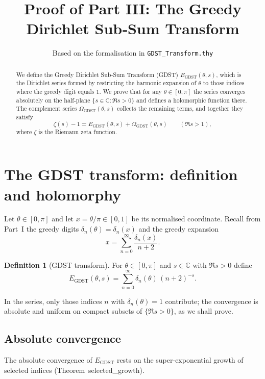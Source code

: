 \documentclass[11pt,a4paper]{article}
\title{Proof of Part III: The Greedy Dirichlet Sub‑Sum Transform}
\author{Based on the formalisation in \texttt{GDST\_Transform.thy}}
\date{}
\theoremstyle{definition}
\newtheorem{definition}[theorem]{Definition}
\theoremstyle{remark}
\newcommand{\C}{\mathbb{C}}
\newcommand{\GDST}{\operatorname{GDST}}
\begin{document}
\maketitle

\begin{abstract}
We define the Greedy Dirichlet Sub‑Sum Transform (GDST) \(E_{\GDST}(\theta,s)\), which is the Dirichlet series formed by restricting the harmonic expansion of \(\theta\) to those indices where the greedy digit equals \(1\).
We prove that for any \(\theta\in[0,\pi]\) the series converges absolutely on the half‑plane \(\{s\in\C:\Re s>0\}\) and defines a holomorphic function there.
The complement series \(\Omega_{\GDST}(\theta,s)\) collects the remaining terms, and together they satisfy
\[
\zeta(s)-1 = E_{\GDST}(\theta,s) + \Omega_{\GDST}(\theta,s) \qquad (\Re s>1),
\]
where \(\zeta\) is the Riemann zeta function.
\end{abstract}

\section{The GDST transform: definition and holomorphy}\label{sec:GDST_def}

Let \(\theta\in[0,\pi]\) and let \(x=\theta/\pi\in[0,1]\) be its normalised coordinate.
Recall from Part~I the greedy digits \(\delta_n(\theta) = \delta_n(x)\) and the greedy expansion
\[
x = \sum_{n=0}^{\infty}\frac{\delta_n(x)}{n+2}.
\]

\begin{definition}[GDST transform]\label{def:E_gdst}
For \(\theta\in[0,\pi]\) and \(s\in\C\) with \(\Re s>0\) define
\begin{equation}\label{eq:E_def}
E_{\GDST}(\theta,s) = \sum_{n=0}^{\infty} \delta_n(\theta)\,(n+2)^{-s}.
\end{equation}
\end{definition}

In the series, only those indices \(n\) with \(\delta_n(\theta)=1\) contribute; the convergence is absolute and uniform on compact subsets of \(\{\Re s>0\}\), as we shall prove.

\subsection{Absolute convergence}

The absolute convergence of \(E_{\GDST}\) rests on the super‑exponential growth of selected indices (Theorem~selected\_growth).
\end{document}

